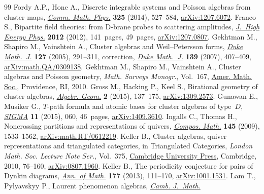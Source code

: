 \documentclass[pdftex]{sigma}
\numberwithin{equation}{section}
\begin{document}
\begin{thebibliography}{99}
Fordy A.P., Hone A., Discrete integrable systems and {P}oisson algebras from
 cluster maps, \href{https://doi.org/10.1007/s00220-013-1867-y}{\textit{Comm. Math. Phys.}} \textbf{325} (2014), 527--584,
 \href{https://arxiv.org/abs/1207.6072}{arXiv:1207.6072}.
Franco S., Bipartite field theories: from {D}-brane probes to scattering
 amplitudes, \href{https://doi.org/10.1007/JHEP11(2012)141}{\textit{J.~High Energy Phys.}} \textbf{2012} (2012), 141~pages,
 49~pages, \href{https://arxiv.org/abs/1207.0807}{arXiv:1207.0807}.
Gekhtman M., Shapiro M., Vainshtein A., Cluster algebras and
 {W}eil--{P}etersson forms, \href{https://doi.org/10.1215/S0012-7094-04-12723-X}{\textit{Duke Math.~J.}} \textbf{127} (2005),
 291--311, correction,
 \href{https://doi.org/10.1215/S0012-7094-07-13925-5}{\textit{Duke Math.~J.}}
 \textbf{139} (2007), 407--409, \href{https://arxiv.org/abs/math.QA/0309138}{arXiv:math.QA/0309138}.
Gekhtman M., Shapiro M., Vainshtein A., Cluster algebras and {P}oisson
 geometry, \textit{Math. Surveys Monogr.}, Vol.~167, \href{https://doi.org/10.1090/surv/167}{Amer. Math. Soc.},
 Providence, RI, 2010.
Gross M., Hacking P., Keel S., Birational geometry of cluster algebras,
 \href{https://doi.org/10.14231/AG-2015-007}{\textit{Algebr. Geom.}} \textbf{2} (2015), 137--175, \href{https://arxiv.org/abs/1309.2573}{arXiv:1309.2573}.
Gunawan E., Musiker G., {$T$}-path formula and atomic bases for cluster
 algebras of type~{$D$}, \href{https://doi.org/10.3842/SIGMA.2015.060}{\textit{SIGMA}} \textbf{11} (2015), 060, 46~pages,
 \href{https://arxiv.org/abs/1409.3610}{arXiv:1409.3610}.
Ingalls C., Thomas H., Noncrossing partitions and representations of quivers,
 \href{https://doi.org/10.1112/S0010437X09004023}{\textit{Compos. Math.}} \textbf{145} (2009), 1533--1562,
 \href{https://arxiv.org/abs/math.RT/0612219}{arXiv:math.RT/0612219}.
Keller B., Cluster algebras, quiver representations and triangulated
 categories, in Triangulated Categories, \textit{London Math. Soc. Lecture
 Note Ser.}, Vol.~375, \href{https://doi.org/10.1017/CBO9781139107075.004}{Cambridge University Press}, Cambridge, 2010, 76--160,
 \href{https://arxiv.org/abs/0807.1960}{arXiv:0807.1960}.
Keller B., The periodicity conjecture for pairs of {D}ynkin diagrams,
 \href{https://doi.org/10.4007/annals.2013.177.1.3}{\textit{Ann. of Math.}} \textbf{177} (2013), 111--170, \href{https://arxiv.org/abs/1001.1531}{arXiv:1001.1531}.
Lam T., Pylyavskyy P., Laurent phenomenon algebras, \href{https://doi.org/10.4310/CJM.2016.v4.n1.a2}{\textit{Camb. J.~Math.}}

\end{thebibliography}
\end{document}
